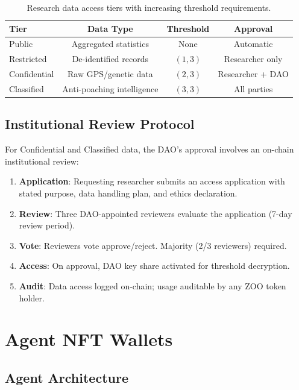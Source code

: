 \documentclass[11pt,letterpaper]{article}
\begin{document}
\begin{table}[t]
\centering
\begin{tabular}{lccc}
\toprule
\textbf{Tier} & \textbf{Data Type} & \textbf{Threshold} & \textbf{Approval} \\
\midrule
Public & Aggregated statistics & None & Automatic \\
Restricted & De-identified records & $(1, 3)$ & Researcher only \\
Confidential & Raw GPS/genetic data & $(2, 3)$ & Researcher + DAO \\
Classified & Anti-poaching intelligence & $(3, 3)$ & All parties \\
\bottomrule
\end{tabular}
\caption{Research data access tiers with increasing threshold requirements.}
\label{tab:tiers}
\end{table}

\subsection{Institutional Review Protocol}

For Confidential and Classified data, the DAO's approval involves an on-chain institutional review:

\begin{enumerate}
    \item \textbf{Application}: Requesting researcher submits an access application with stated purpose, data handling plan, and ethics declaration.
    \item \textbf{Review}: Three DAO-appointed reviewers evaluate the application (7-day review period).
    \item \textbf{Vote}: Reviewers vote approve/reject. Majority (2/3 reviewers) required.
    \item \textbf{Access}: On approval, DAO key share activated for threshold decryption.
    \item \textbf{Audit}: Data access logged on-chain; usage auditable by any ZOO token holder.
\end{enumerate}

\section{Agent NFT Wallets}
\label{sec:agent-wallets}

\subsection{Agent Architecture}
\end{document}
